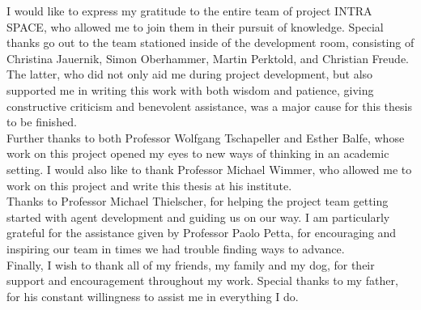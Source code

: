 \documentclass[draft,final]{vutinfth} %
\begin{document}
\begin{acknowledgements*}

I would like to express my gratitude to the entire team of project INTRA SPACE, who allowed me to join them in their pursuit of knowledge. 
Special thanks go out to the team stationed inside of the development room, consisting of Christina Jauernik, Simon Oberhammer, Martin Perktold, and Christian Freude. 
The latter, who did not only aid me during project development, but also supported me in writing this work with both wisdom and patience, giving constructive criticism and benevolent assistance, was a major cause for this thesis to be finished. \\
Further thanks to both Professor Wolfgang Tschapeller and Esther Balfe, whose work on this project opened my eyes to new ways of thinking in an academic setting. 
I would also like to thank Professor Michael Wimmer, who allowed me to work on this project and write this thesis at his institute. \\
Thanks to Professor Michael Thielscher, for helping the project team getting started with agent development and guiding us on our way. 
I am particularly grateful for the assistance given by Professor Paolo Petta, for encouraging and inspiring our team in times we had trouble finding ways to advance. \\
Finally, I wish to thank all of my friends, my family and my dog, for their support and encouragement throughout my work. 
Special thanks to my father, for his constant willingness to assist me in everything I do.

\end{acknowledgements*}
\end{document}
